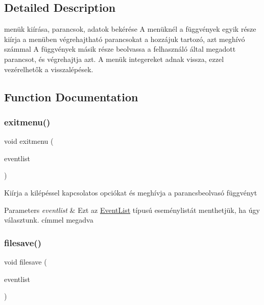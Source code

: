\subsection{Detailed Description}
menük kiírása, parancsok, adatok bekérése A menüknél a függvények egyik része kiírja a menüben végrehajtható parancsokat a hozzájuk tartozó, azt meghívó számmal A függvények másik része beolvassa a felhasználó által megadott parancsot, és végrehajtja azt. A menük integereket adnak vissza, ezzel vezérelhetők a visszalépések. 



\subsection{Function Documentation}
\mbox{\label{group__menu_gac651d3838f4da7bf6055fa839621e289}} 
\subsubsection{\texorpdfstring{exitmenu()}{exitmenu()}}
{\footnotesize\ttfamily void exitmenu (\begin{DoxyParamCaption}\item[{\hyperlink{struct_event_list}{Event\+List} $\ast$}]{eventlist }\end{DoxyParamCaption})}

Kiírja a kilépéssel kapcsolatos opciókat és meghívja a parancsbeolvasó függvényt 
\begin{DoxyParams}{Parameters}
{\em eventlist} & Ezt az \hyperlink{struct_event_list}{Event\+List} típusú eseménylistát menthetjük, ha úgy választunk. címmel megadva \\
\hline
\end{DoxyParams}
\mbox{\label{group__menu_ga6ee903116c3ec27e1a4680b08e6647e2}} 
\subsubsection{\texorpdfstring{filesave()}{filesave()}}
{\footnotesize\ttfamily void filesave (\begin{DoxyParamCaption}\item[{\hyperlink{struct_event_list}{Event\+List} const $\ast$}]{eventlist }\end{DoxyParamCaption})}

